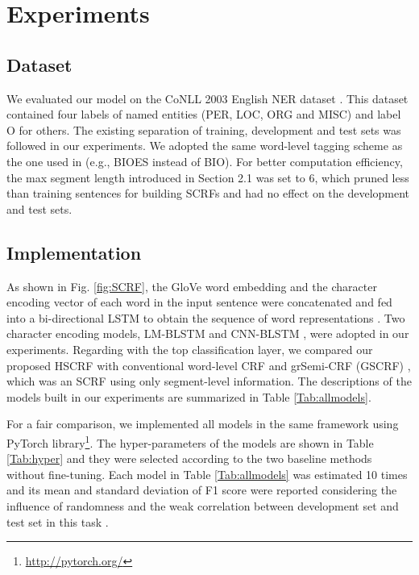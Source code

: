\documentclass[11pt,a4paper]{article}
\begin{document}
\section{Experiments}


\subsection{Dataset}
We evaluated our model on the CoNLL 2003 English NER dataset \cite{tjong2003introduction}.
This dataset contained four labels of named entities (PER, LOC, ORG and MISC) and label O for others.
The existing separation of training, development and test sets was followed in our experiments.
We adopted the same word-level tagging scheme as the one used in \citet{liu2017empower} (e.g., BIOES instead of BIO). For better computation efficiency, the max segment length  introduced in Section 2.1 was set to 6,
which pruned less than  training sentences for building SCRFs and had no effect on the development and test sets.


\subsection{Implementation}
As shown in Fig. \ref{fig:SCRF}, the  GloVe \cite{pennington2014glove} word embedding and the character encoding vector of each word in the input sentence were concatenated
and fed into a bi-directional LSTM to obtain the sequence of word representations .
Two character encoding models, LM-BLSTM \cite{liu2017empower} and CNN-BLSTM \cite{ma2016end}, were adopted in our experiments.
Regarding with the top classification layer, we compared our proposed HSCRF with conventional word-level CRF and
grSemi-CRF (GSCRF) \cite{zhuo2016segment}, which was an SCRF using only segment-level information.
The descriptions of the models built in our experiments are summarized in Table \ref{Tab:allmodels}.

For a fair comparison, we implemented all models in the same framework using PyTorch library\footnote{\url{http://pytorch.org/}}.
The hyper-parameters of the models are shown in Table \ref{Tab:hyper} and they were selected according to the two baseline methods without fine-tuning.
Each model in Table \ref{Tab:allmodels} was estimated 10 times and its mean and standard deviation of F1 score were reported
considering the influence of randomness and the weak correlation between development set and test set in this task \cite{Nils2017Reporting}.
\end{document}
